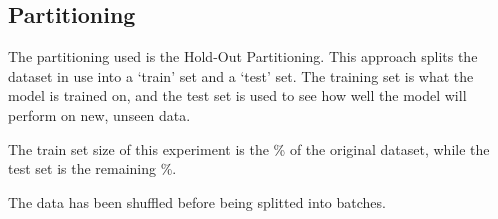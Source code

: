 \documentclass[12pt, a4paper]{article}
\begin{document}




\subsection{Partitioning}

The partitioning used is the Hold-Out Partitioning.
This approach splits the dataset in use into a ‘train’ set and a ‘test’ set.
The training set is what the model is trained on, and the test set is used to see how
well the model will perform on new, unseen data.



The train set size of this experiment is the \%
of the original dataset, while the test set is the remaining \%.

The data has been shuffled before being splitted into batches.


\end{document}
